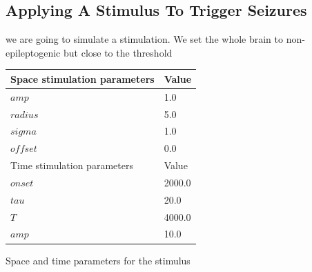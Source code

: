 \documentclass{tufte-handout}
\begin{document}


\subsection{Applying A Stimulus To Trigger Seizures}

 we are going to simulate a stimulation.
We set the whole brain to non-epileptogenic but close to the threshold

\begin{margintable}
  \centering
  \selectfont
  \begin{tabular}{ll}
    \toprule
    Space stimulation parameters & Value \\
    \midrule
             $amp$              &   1.0  \\
             $radius$           &   5.0   \\
             $sigma$            &   1.0  \\
             $offset$           &   0.0  \\
    \midrule
    \midrule
    Time stimulation parameters & Value \\
    \midrule
             $onset$          &   2000.0  \\
             $tau$            &   20.0    \\
             $T$              &   4000.0  \\
             $amp$            &   10.0    \\
    \bottomrule
  \end{tabular}
  \caption{Space and time parameters for the stimulus}
  \label{tab:stimtab}
\end{margintable}
\end{document}
